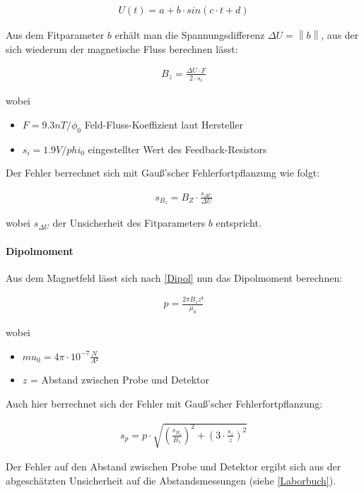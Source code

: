 \documentclass[12pt]{article}
\begin{document}
\begin{align}
U(t) = a + b\cdot sin(c\cdot t+d)
\end{align}

Aus dem Fitparameter $b$ erhält man die Spannungsdifferenz $\Delta U = \left\| b \right\| $, aus der sich wiederum der magnetische Fluss berechnen lässt:

\begin{align}
B_z = \frac{\Delta U \cdot F }{2 \cdot s_i} 
\end{align}

wobei 

\begin{itemize}
\item $ F = 9.3 nT/\phi_0$  Feld-Fluss-Koeffizient laut Hersteller
\item $s_i = 1.9 V/phi_{0}$ eingestellter Wert des Feedback-Resistors
\end{itemize}

Der Fehler berrechnet sich mit Gauß'scher Fehlerfortpflanzung wie folgt:

\begin{align}
s_{B_z} = B_Z \cdot \frac{s_{\Delta U}}{\Delta U}
\end{align}

wobei $s_{\Delta U}$ der Unsicherheit des Fitparameters $b$ entspricht.

\paragraph{Dipolmoment} Aus dem Magnetfeld lässt sich nach \ref{Dipol} nun das Dipolmoment berechnen:

\begin{align}
p = \frac{2\pi B_z z³}{\mu_0}
\end{align}

wobei 
\begin{itemize}
\item $mu_0 = 4 \pi \cdot 10^{-7} \frac{N}{A²}$
\item $z$ = Abstand zwischen Probe und Detektor
\end{itemize}

Auch hier berrechnet sich der Fehler mit Gauß'scher Fehlerfortpflanzung:

\begin{align}
s_p = p \cdot \sqrt{\left( \frac{s_{B_z}}{B_z}\right)^2  + \left(3\cdot \frac{s_z}{z}\right)^2}
\end{align}

Der Fehler auf den Abstand zwischen Probe und Detektor ergibt sich aus der abgeschätzten Unsicherheit auf die Abstandsmessungen (siehe \ref{Laborbuch}).	
\end{document}
